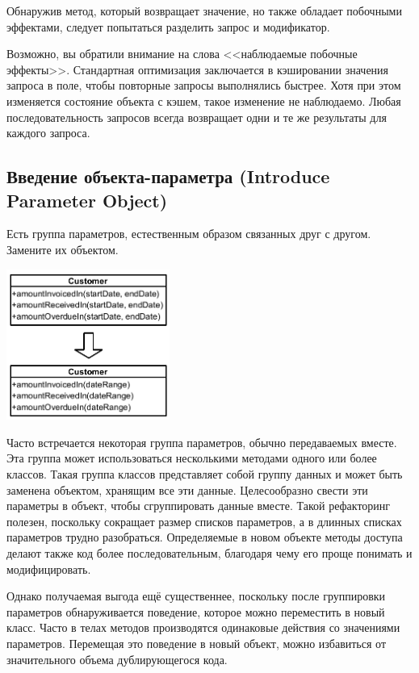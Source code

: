 \documentclass{../../text-style}
\begin{document}
Обнаружив метод, который возвращает значение, но также обладает побочными эффектами, следует попытаться разделить запрос и модификатор.

Возможно, вы обратили внимание на слова <<наблюдаемые побочные эффекты>>. Стандартная оптимизация заключается в кэшировании значения запроса в поле, чтобы повторные запросы выполнялись быстрее. Хотя при этом изменяется состояние объекта с кэшем, такое изменение не наблюдаемо. Любая последовательность запросов всегда возвращает одни и те же результаты для каждого запроса.

\subsection{Введение объекта-параметра (Introduce Parameter Object)}

Есть группа параметров, естественным образом связанных друг с другом. Замените их объектом.

\begin{center}
    \includegraphics[width=0.4\textwidth]{introduceParameterObject.png}
\end{center}

Часто встречается некоторая группа параметров, обычно передаваемых вместе. Эта группа может использоваться несколькими методами одного или более классов. Такая группа классов представляет собой группу данных и может быть заменена объектом, хранящим все эти данные. Целесообразно свести эти параметры в объект, чтобы сгруппировать данные вместе. Такой рефакторинг полезен, поскольку сокращает размер списков параметров, а в длинных списках параметров трудно разобраться. Определяемые в новом объекте методы доступа делают также код более последовательным, благодаря чему его проще понимать и модифицировать.

Однако получаемая выгода ещё существеннее, поскольку после группировки параметров обнаруживается поведение, которое можно переместить в новый класс. Часто в телах методов производятся одинаковые действия со значениями параметров. Перемещая это поведение в новый объект, можно избавиться от значительного объема дублирующегося кода.
\end{document}
